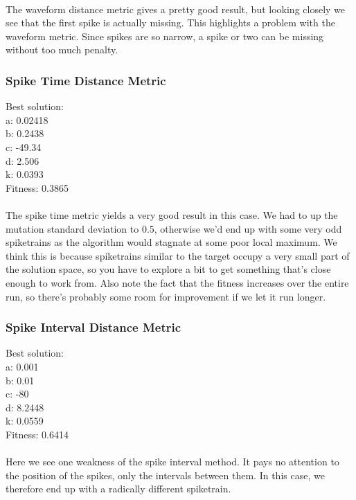 \documentclass[a4paper,12pt]{article}
\begin{document}
\paragraph{}The waveform distance metric gives a pretty good result, but looking closely we see that the first spike is actually missing. This highlights a problem with the waveform metric. Since spikes are so narrow, a spike or two can be missing without too much penalty.

\subsubsection{Spike Time Distance Metric}
Best solution: \\
a: 0.02418 \\
b: 0.2438 \\
c: -49.34 \\
d: 2.506 \\
k: 0.0393 \\
Fitness: 0.3865
\paragraph{}The spike time metric yields a very good result in this case. We had to up the mutation standard deviation to 0.5, otherwise we'd end up with some very odd spiketrains as the algorithm would stagnate at some poor local maximum. We think this is because spiketrains similar to the target occupy a very small part of the solution space, so you have to explore a bit to get something that's close enough to work from. Also note the fact that the fitness increases over the entire run, so there's probably some room for improvement if we let it run longer.

\subsubsection{Spike Interval Distance Metric}
Best solution: \\
a: 0.001 \\
b: 0.01 \\
c: -80 \\
d: 8.2448 \\
k: 0.0559 \\
Fitness: 0.6414
\paragraph{}Here we see one weakness of the spike interval method. It pays no attention to the position of the spikes, only the intervals between them. In this case, we therefore end up with a radically different spiketrain.
\end{document}
